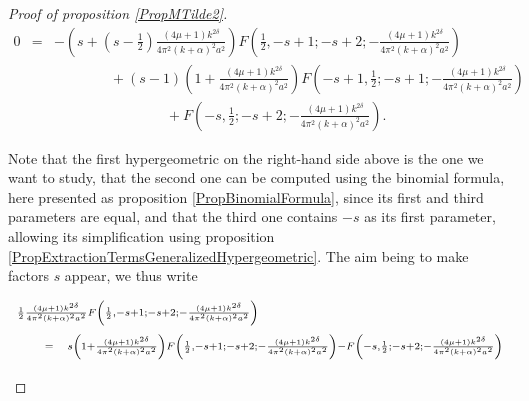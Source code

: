 \documentclass{jams-l}
\theoremstyle{definition}
\theoremstyle{remark}
\numberwithin{equation}{section}
\begin{document}
\begin{proof}[Proof of proposition \ref{PropMTilde2}]
                        \[ \begin{array}{lll}
                                \scriptstyle 0 & \scriptstyle = & \scriptstyle - \left( s + \left( s - \frac{1}{2} \right) \frac{\left( 4 \mu + 1 \right) k^{2 \delta}}{4 \pi^2 \left( k + \alpha \right)^2 a^2} \right) F \left( \frac{1}{2}, -s+1; -s+2; - \frac{\left( 4 \mu + 1 \right) k^{2 \delta}}{4 \pi^2 \left( k + \alpha \right)^2 a^2} \right) \\[0.5em]
                                
                                && \qquad \qquad \scriptstyle + \left( s-1 \right) \left( 1 + \frac{\left( 4 \mu + 1 \right) k^{2 \delta}}{4 \pi^2 \left( k + \alpha \right)^2 a^2} \right) F \left( -s+1, \frac{1}{2}; -s+1;  - \frac{\left( 4 \mu + 1 \right) k^{2 \delta}}{4 \pi^2 \left( k + \alpha \right)^2 a^2} \right) \\[0.5em]
                                
                                && \qquad \qquad \qquad \qquad \scriptstyle + F \left( -s, \frac{1}{2}; -s+2; - \frac{\left( 4 \mu + 1 \right) k^{2 \delta}}{4 \pi^2 \left( k + \alpha \right)^2 a^2} \right).
                            \end{array} \]
                        
                        \noindent Note that the first hypergeometric on the right-hand side above is the one we want to study, that the second one can be computed using the binomial formula, here presented as proposition \ref{PropBinomialFormula}, since its first and third parameters are equal, and that the third one contains $-s$ as its first parameter, allowing its simplification using proposition \ref{PropExtractionTermsGeneralizedHypergeometric}. The aim being to make factors $s$ appear, we thus write
                        
                        \[ \begin{array}{lll}
                                \multicolumn{3}{l}{\scriptstyle \frac{1}{2} \frac{\left( 4 \mu + 1 \right) k^{2 \delta}}{4 \pi^2 \left( k + \alpha \right)^2 a^2} F \left( \frac{1}{2}, -s+1; -s+2; - \frac{\left( 4 \mu + 1 \right) k^{2 \delta}}{4 \pi^2 \left( k + \alpha \right)^2 a^2} \right)} \\[1em]
                                
                                \quad & \scriptstyle = & \scriptstyle s \left( 1 + \frac{\left( 4 \mu + 1 \right) k^{2 \delta}}{4 \pi^2 \left( k + \alpha \right)^2 a^2} \right) F \left( \frac{1}{2}, -s+1; -s+2; - \frac{\left( 4 \mu + 1 \right) k^{2 \delta}}{4 \pi^2 \left( k + \alpha \right)^2 a^2} \right) - F \left( -s, \frac{1}{2}; -s+2; - \frac{\left( 4 \mu + 1 \right) k^{2 \delta}}{4 \pi^2 \left( k + \alpha \right)^2 a^2} \right) \\[1em]
                                

\end{array}\]
\end{proof}
\end{document}
